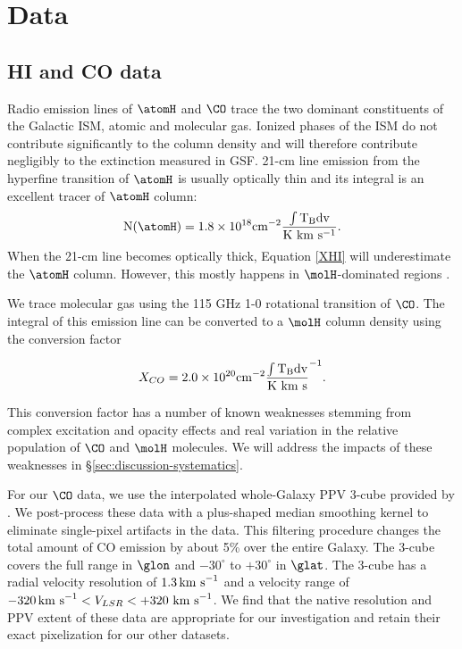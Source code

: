 \section{Data}
\label{sec:data}
\subsection{HI and CO data}

Radio emission lines of $\atomH$ and $\CO$ trace the two dominant constituents of the Galactic ISM, atomic and molecular gas. 
Ionized phases of the ISM do not contribute significantly to the column density and will therefore contribute negligibly to the extinction measured in GSF. 
21-cm line emission from the hyperfine transition of $\atomH$ is usually optically thin and its integral is an excellent tracer of $\atomH$ column:
\begin{equation}\label{XHI}
{\rm N(\atomH)} = 1.8 \times 10^{18} \rm cm^{-2} \frac{ \int T_B dv}{\rm K~km~s^{-1}}.
\end{equation}
When the 21-cm line becomes optically thick, Equation \ref{XHI} will underestimate the $\atomH$ column. 
However, this mostly happens in $\molH$-dominated regions \citep{Goldsmith_2007}.

We trace molecular gas using the 115 GHz 1-0 rotational transition of $\CO$. 
The integral of this emission line can be converted to a $\molH$ column density using the conversion factor \citep{Bolatto_2013}

\begin{equation}\label{XCO}
X_{CO} = 2.0 \times 10^{20} \rm cm^{-2} \frac{ \int T_B dv}{\rm K~km~s}^{-1}.
\end{equation}

This conversion factor has a number of known weaknesses stemming from complex excitation and opacity effects and real variation in the relative population of $\CO$ and $\molH$ molecules. 
We will address the impacts of these weaknesses in \S \ref{sec:discussion-systematics}. 

For our $\CO$ data, we use the interpolated whole-Galaxy PPV 3-cube provided by \citet{Dame_2001}. 
We post-process these data with a plus-shaped median smoothing kernel to eliminate single-pixel artifacts in the data. 
This filtering procedure changes the total amount of CO emission by about 5\% over the entire Galaxy. 
The 3-cube covers the full range in $\glon$ and $-30^\circ$ to $+30^\circ$ in $\glat$. 
The 3-cube has a radial velocity resolution of $1.3 {\rm \, km~s}^{-1}$ and a velocity range of $-320{\rm \,km~s} ^{-1} < V_{LSR} < +320 \rm{~km~s}^{-1}$. 
We find that the native resolution and PPV extent of these data are appropriate for our investigation and retain their exact pixelization for our other datasets.

